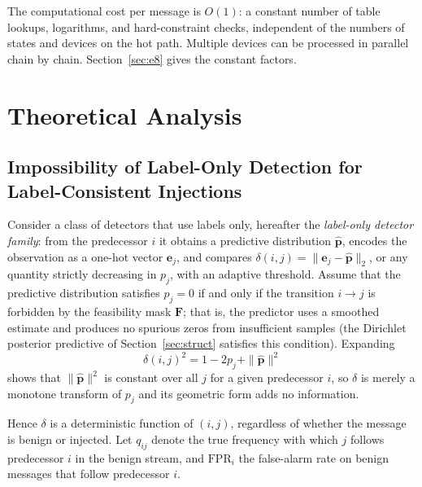 \documentclass[manuscript,screen,review]{acmart}
\begin{document}
The computational cost per message is $O(1)$: a constant number of table lookups, logarithms, and hard-constraint checks, independent of the numbers of states and devices on the hot path. Multiple devices can be processed in parallel chain by chain. Section~\ref{sec:e8} gives the constant factors.

\section{Theoretical Analysis}
\label{sec:theory}

\subsection{Impossibility of Label-Only Detection for Label-Consistent Injections}
\label{sec:ta}

Consider a class of detectors that use labels only, hereafter the \emph{label-only detector family}: from the predecessor $i$ it obtains a predictive distribution $\hat{\mathbf p}$, encodes the observation as a one-hot vector $\mathbf e_j$, and compares $\delta(i,j)=\|\mathbf e_j-\hat{\mathbf p}\|_2$, or any quantity strictly decreasing in $p_j$, with an adaptive threshold. Assume that the predictive distribution satisfies $p_j=0$ if and only if the transition $i\to j$ is forbidden by the feasibility mask $\mathbf F$; that is, the predictor uses a smoothed estimate and produces no spurious zeros from insufficient samples (the {Dirichlet} posterior predictive of Section~\ref{sec:struct} satisfies this condition). Expanding
\begin{equation}
  \delta(i,j)^2=1-2p_j+\|\hat{\mathbf p}\|^2
\end{equation}
shows that $\|\hat{\mathbf p}\|^2$ is constant over all $j$ for a given predecessor $i$, so $\delta$ is merely a monotone transform of $p_j$ and its geometric form adds no information.

Hence $\delta$ is a deterministic function of $(i,j)$, regardless of whether the message is benign or injected. Let $q_{ij}$ denote the true frequency with which $j$ follows predecessor $i$ in the benign stream, and $\mathrm{FPR}_i$ the false-alarm rate on benign messages that follow predecessor $i$.
\end{document}
